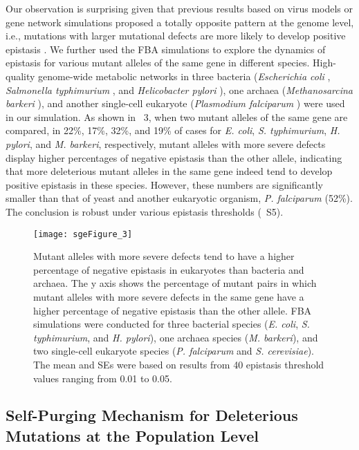 Our observation is surprising given that previous results based on
virus models or gene network simulations proposed a totally opposite
pattern at the genome level, i.e., mutations with larger mutational
defects are more likely to develop positive epistasis \citep{Burch2004, 
You2002, Sanjuan2006a, Azevedo2006, Lohaus2010}. We
further used the FBA simulations to explore the dynamics of epistasis
for various mutant alleles of the same gene in different
species. High-quality genome-wide metabolic networks in three bacteria
(\textit{Escherichia coli} \citep{Feist2007}, \textit{Salmonella typhimurium} \citep{Thiele2011},
and \textit{Helicobacter pylori} \citep{Thiele2005}), one archaea
(\textit{Methanosarcina barkeri} \citep{Feist2006}), and another single-cell
eukaryote (\textit{Plasmodium falciparum} \citep{Plata2010}) were used in our
simulation. As shown in \Fig~3, when two mutant alleles of the same
gene are compared, in 22\%, 17\%, 32\%, and 19\% of cases for
\textit{E. coli}, \textit{S. typhimurium}, \textit{H. pylori}, and
\textit{M. barkeri}, respectively, mutant
alleles with more severe defects display higher percentages of
negative epistasis than the other allele, indicating that more
deleterious mutant alleles in the same gene indeed tend to develop
positive epistasis in these species. However, these numbers are
significantly smaller than that of yeast and another eukaryotic
organism, \textit{P. falciparum} (52\%). The conclusion is robust
under various epistasis thresholds (\Fig~S5).

\begin{figure}
\centering
\texttt{[image: sgeFigure\_3]}
\caption{Mutant alleles with more severe defects tend to have a higher
percentage of negative epistasis in eukaryotes than bacteria and
archaea. The y axis shows the percentage of mutant pairs in which
mutant alleles with more severe defects in the same gene have a higher
percentage of negative epistasis than the other allele. FBA
simulations were conducted for three bacterial species
(\textit{E. coli}, \textit{S. typhimurium}, and \textit{H. pylori}),
one archaea species (\textit{M. barkeri}), and two single-cell
eukaryote species (\textit{P. falciparum} and
\textit{S. cerevisiae}). The mean and SEs were based on results from
40 epistasis threshold values ranging from 0.01 to 0.05.}
\label{fig:speciesPurging}
\end{figure}

\subsection{Self-Purging Mechanism for Deleterious Mutations at the
Population Level}


